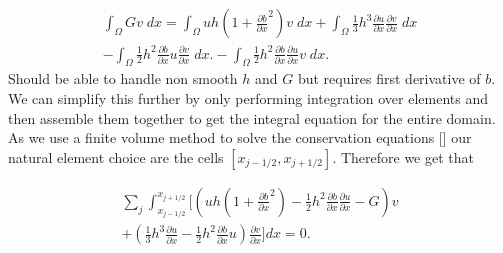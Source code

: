

\begin{multline*}
\int_{\Omega } G v \; dx = \int_{\Omega } uh \left(1 + \frac{\partial b}{\partial x}^2 \right) v \; dx +  \int_{\Omega } \frac{1}{3}h^3  \frac{\partial {u}}{\partial x} \frac{\partial v}{\partial x} \; dx  \\ - 
\int_{\Omega }   \frac{1}{2}h^2\frac{\partial b}{\partial x} u \frac{\partial v }{\partial x}\; dx. - 
\int_{\Omega }   \frac{1}{2}h^2\frac{\partial b}{\partial x}  \frac{\partial u }{\partial x}v \; dx.
\end{multline*}
Should be able to handle non smooth $h$ and $G$ but requires first derivative of $b$. We can simplify this further by only performing integration over elements and then assemble them together to get the integral equation for the entire domain. As we use a finite volume method to solve the conservation equations [] our natural element choice are the cells $\left[x_{j-1/2},x_{j+1/2}\right]$. Therefore we get that

\begin{multline}
\label{eq:elementwiseint}
 \sum_{j}  \int_{x_{j-1/2} }^{{x_{j+1/2}}} \Bigg[  \left( uh \left(1 + \frac{\partial b}{\partial x}^2 \right)  - \frac{1}{2}h^2\frac{\partial b}{\partial x}  \frac{\partial u }{\partial x}  -  G \right) v   \\ +  \left( \frac{1}{3}h^3  \frac{\partial {u}}{\partial x}    -     \frac{1}{2}h^2\frac{\partial b}{\partial x} u    \right) \frac{\partial v }{\partial x} \Bigg]dx  = 0.
\end{multline}

